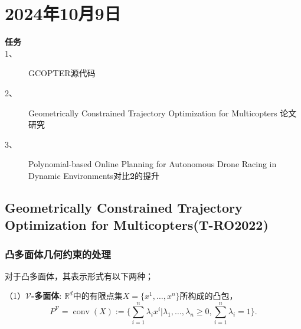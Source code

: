 \section{2024年10月9日}
\begin{tcolorbox}[cyan]
    \begin{description}
        \item[\large \textbf{任务}]
        \item[1、] GCOPTER源代码
        \item[2、] Geometrically Constrained Trajectory Optimization for Multicopters 论文研究
        \item[3、] Polynomial-based Online Planning for Autonomous Drone Racing in Dynamic Environments对比\textbf{2}的提升
    \end{description}
\end{tcolorbox}
\subsection{Geometrically Constrained Trajectory Optimization for Multicopters(T-RO2022)}
\subsubsection{凸多面体几何约束的处理}
对于凸多面体，其表示形式有以下两种；


（1）\textbf{$\mathcal{V}$-多面体}: $\mathbb{R} ^d$中的有限点集$X=\{x^{1},\ldots,x^{n}\}$所构成的凸包，
\begin{equation}
    P^\mathcal{V}=\operatorname{conv}(X) := \{\sum_{i=1}^n\lambda_ix^i \Big| \lambda_1,\ldots,\lambda_n\geq0,
     \sum_{i=1}^n\lambda_i=1\Big\}.
\end{equation}


